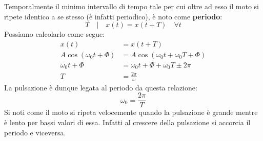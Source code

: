 \documentclass[10pt,a4paper]{book}
\begin{document}
Temporalmente il minimo intervallo di tempo tale per cui oltre ad esso il moto si ripete identico a se stesso (è infatti periodico),  è noto come \textbf{periodo}:
\[
	T \quad | \quad x(t)=x(t+T) \quad \forall t
\]
Possiamo calcolarlo come segue:
\begin{align*}
	x(t) &= x(t+T) \\
	A\cos(\omega_0 t+\Phi) &= A\cos(\omega_0 t +\omega_0 T+\Phi) \\
	\omega_0 t+\Phi &= \omega_0 t+\Phi+\omega_0 T \pm 2\pi \\
	T &= \frac{2\pi}{\omega}
\end{align*}
La pulsazione è dunque legata al periodo da questa relazione:
\[
	\boxed{\omega_0=\frac{2\pi}{T}}
\]
Si noti come il moto si ripeta velocemente quando la pulsazione è grande mentre è lento per bassi valori di essa. Infatti al crescere della pulsazione si accorcia il periodo e viceversa.
\end{document}
